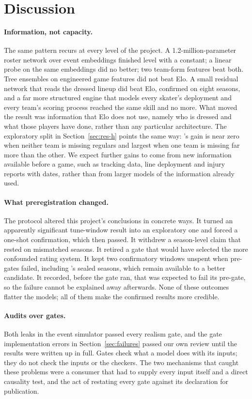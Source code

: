 \section{Discussion}
\label{sec:discussion}

\paragraph{Information, not capacity.}
The same pattern recurs at every level of the project. A 1.2-million-parameter
roster network over event embeddings finished level with a constant; a linear
probe on the same embeddings did no better; two team-form features beat both.
Tree ensembles on engineered game features did not beat Elo. A small residual
network that reads the dressed lineup did beat Elo, confirmed on eight seasons,
and a far more structured engine that models every skater's deployment and
every team's scoring process reached the same skill and no more. What moved
the result was information that Elo does not use, namely who is dressed and
what those players have done, rather than any particular architecture. The
exploratory split in Section~\ref{sec:res-h} points the same way: \neurhlH{}'s
gain is near zero when neither team is missing regulars and largest when one
team is missing far more than the other. We
expect further gains to come from new information available before a game,
such as tracking data, line deployment and injury reports with dates, rather
than from larger models of the information already used.

\paragraph{What preregistration changed.}
The protocol altered this project's conclusions in concrete ways. It turned an
apparently significant tune-window result into an exploratory one and forced
a one-shot confirmation, which then passed. It withdrew a season-level claim
that rested on mismatched seasons. It retired a gate that would have selected
the more confounded rating system. It kept two confirmatory windows unspent
when pre-gates failed, including \neurhlG{}'s sealed seasons, which remain
available to a better candidate. It recorded, before the gate ran, that \neurhlG{}
was expected to fail its pre-gate, so the failure cannot be explained away
afterwards. None of these outcomes flatter the models; all of them make the
confirmed results more credible.

\paragraph{Audits over gates.}
Both leaks in the event simulator passed every realism gate, and the gate
implementation errors in Section~\ref{sec:failures} passed our own review
until the results were written up in full. Gates check what a model does with
its inputs; they do not check the inputs or the checkers. The two mechanisms
that caught these problems were a consumer that had to supply every input
itself and a direct causality test, and the act of restating every gate
against its declaration for publication.

